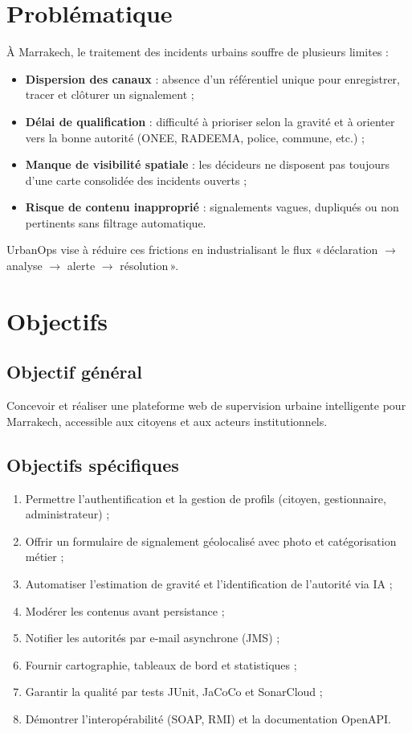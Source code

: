 \documentclass[12pt,a4paper,oneside]{report}
\begin{document}
\section{Problématique}

À Marrakech, le traitement des incidents urbains souffre de plusieurs limites :
\begin{itemize}[leftmargin=*]
  \item \textbf{Dispersion des canaux} : absence d'un référentiel unique pour enregistrer, tracer et clôturer un signalement ;
  \item \textbf{Délai de qualification} : difficulté à prioriser selon la gravité et à orienter vers la bonne autorité (ONEE, RADEEMA, police, commune, etc.) ;
  \item \textbf{Manque de visibilité spatiale} : les décideurs ne disposent pas toujours d'une carte consolidée des incidents ouverts ;
  \item \textbf{Risque de contenu inapproprié} : signalements vagues, dupliqués ou non pertinents sans filtrage automatique.
\end{itemize}

UrbanOps vise à réduire ces frictions en industrialisant le flux «\,déclaration $\rightarrow$ analyse $\rightarrow$ alerte $\rightarrow$ résolution\,».

\section{Objectifs}

\subsection{Objectif général}
Concevoir et réaliser une plateforme web de supervision urbaine intelligente pour Marrakech, accessible aux citoyens et aux acteurs institutionnels.

\subsection{Objectifs spécifiques}
\begin{enumerate}[leftmargin=*]
  \item Permettre l'authentification et la gestion de profils (citoyen, gestionnaire, administrateur) ;
  \item Offrir un formulaire de signalement géolocalisé avec photo et catégorisation métier ;
  \item Automatiser l'estimation de gravité et l'identification de l'autorité via IA ;
  \item Modérer les contenus avant persistance ;
  \item Notifier les autorités par e-mail asynchrone (JMS) ;
  \item Fournir cartographie, tableaux de bord et statistiques ;
  \item Garantir la qualité par tests JUnit, JaCoCo et SonarCloud ;
  \item Démontrer l'interopérabilité (SOAP, RMI) et la documentation OpenAPI.
\end{enumerate}
\end{document}
